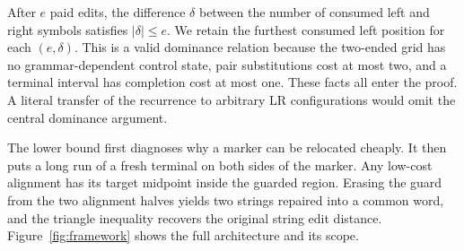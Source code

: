 \documentclass[sigconf,screen]{acmart}
\theoremstyle{definition}
\begin{document}
After $e$ paid edits, the difference $\delta$ between the number of consumed left and right symbols satisfies $|\delta|\le e$. We retain the furthest consumed left position for each $(e,\delta)$. This is a valid dominance relation because the two-ended grid has no grammar-dependent control state, pair substitutions cost at most two, and a terminal interval has completion cost at most one. These facts all enter the proof. A literal transfer of the recurrence to arbitrary LR configurations would omit the central dominance argument.

The lower bound first diagnoses why a marker can be relocated cheaply. It then puts a long run of a fresh terminal on both sides of the marker. Any low-cost alignment has its target midpoint inside the guarded region. Erasing the guard from the two alignment halves yields two strings repaired into a common word, and the triangle inequality recovers the original string edit distance. Figure~\ref{fig:framework} shows the full architecture and its scope.
\end{document}
